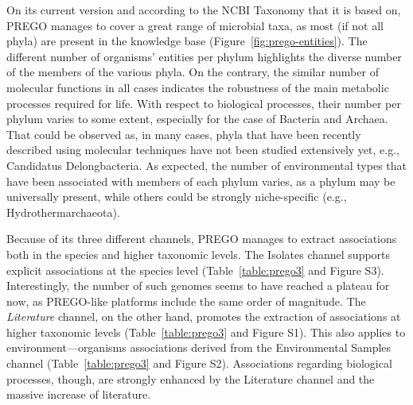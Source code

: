 {   On its current version and according to the NCBI Taxonomy that it is based on, PREGO manages to cover a great range of microbial taxa, as most (if not all phyla) are present in the knowledge base (Figure~\ref{fig:prego-entities}). 
   The different number of organisms' entities per phylum highlights the diverse number of the members of the various phyla. On the contrary, the similar number of molecular functions in all cases indicates the robustness of the main metabolic processes required for life. 
   With respect to biological processes, their number per phylum varies to some extent, especially for the case of Bacteria and Archaea. 
   That could be observed as, in many cases, phyla that have been recently described using molecular techniques have not been studied extensively yet, e.g., Candidatus Delongbacteria. 
   As expected, the number of environmental types that have been associated with members of each phylum varies, as a phylum may be universally present, while others could be strongly niche-specific (e.g., Hydrothermarchaeota).

   Because of its three different channels, PREGO manages to extract associations both in the species and higher taxonomic levels. The Isolates channel supports explicit associations at the species level (Table~\ref{table:prego3} and Figure S3). 
   Interestingly, the number of such genomes seems to have reached a plateau for now, as PREGO-like platforms include the same order of magnitude. 
   The \textit{Literature} channel, on the other hand, promotes the extraction of associations at higher taxonomic levels (Table~\ref{table:prego3} and Figure S1). 
   This also applies to environment—organisms associations derived from the Environmental Samples channel (Table~\ref{table:prego3} and Figure S2). Associations regarding biological processes, though, are strongly enhanced by the Literature channel and the massive increase of literature.


}
